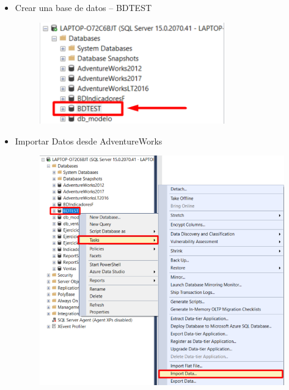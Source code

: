 \documentclass{article}
\begin{document}
\begin{itemize}
\item Crear una base de datos – BDTEST
	\begin{figure}[htb]
		\begin{center}
			\includegraphics[width=8cm]{./images/Tarea1_1}
			
		\end{center}
	\end{figure}
\item Importar Datos desde AdventureWorks
	\begin{figure}[htb]
		\begin{center}
			\includegraphics[width=13cm]{./images/Tarea1_2}
			
		\end{center}
	\end{figure}

\newpage



\end{itemize}
\end{document}
